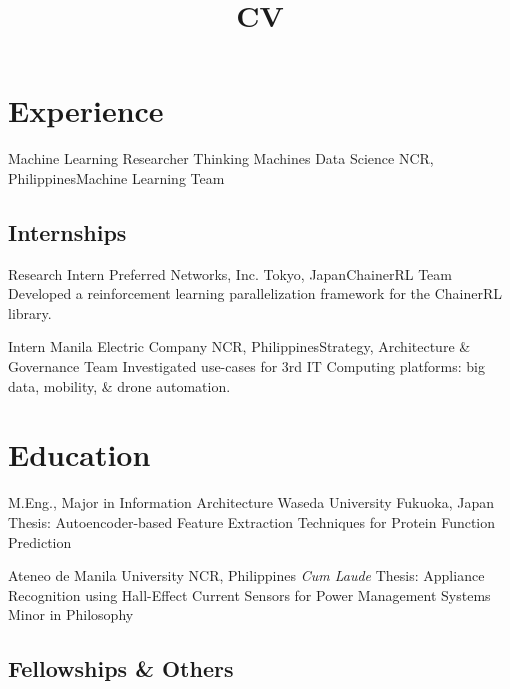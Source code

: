 \documentclass[11pt,a4paper,sans]{moderncv}
\title{CV}
\begin{document}
\maketitle

\section{Experience}
        {Machine Learning Researcher}
        {Thinking Machines Data Science}
        {NCR, Philippines}{Machine Learning Team}
        {
        }

\subsection{Internships}

        {Research Intern}
        {Preferred Networks, Inc.}
        {Tokyo, Japan}{ChainerRL Team}
        {Developed a reinforcement learning parallelization framework for the ChainerRL library.}

        {Intern}
        {Manila Electric Company}
        {NCR, Philippines}{Strategy, Architecture \& Governance Team}
        {Investigated use-cases for 3rd IT Computing platforms: big data,
        mobility, \& drone automation.}


\section{Education}
        {M.Eng., Major in Information Architecture}
        {Waseda University}
        {Fukuoka, Japan}{}
        {Thesis: Autoencoder-based Feature Extraction Techniques for Protein
        Function Prediction}

        {Ateneo de Manila University}
        {NCR, Philippines}
        {\textit{Cum Laude}}
        {
        Thesis: Appliance Recognition using Hall-Effect Current Sensors for
        Power Management Systems\\
        Minor in Philosophy
        }


\subsection{Fellowships \& Others}
\end{document}
